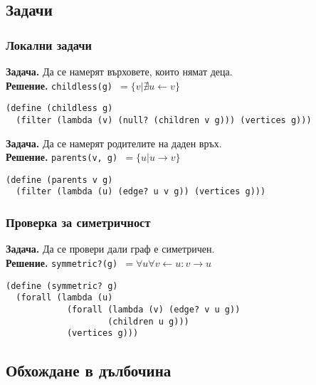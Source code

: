\documentclass{beamer}
\begin{document}
\subsection{Задачи}

\begin{frame}[fragile]
  \frametitle{Локални задачи}

  \small
  \textbf{Задача. }Да се намерят върховете, които нямат деца.\\
  \pause
  \textbf{Решение. }\tt{childless(g)} $ = \{v | \nexists u \leftarrow v \}$
  \pause
\begin{lstlisting}
(define (childless g)
  (filter (lambda (v) (null? (children v g))) (vertices g)))
\end{lstlisting}
  \pause
  \vspace{1em}
  \textbf{Задача. }Да се намерят родителите на даден връх.\\
  \pause
  \textbf{Решение. }\tt{parents(v, g)} $ = \{u | u \rightarrow v \}$
  \pause
\begin{lstlisting}
(define (parents v g)
  (filter (lambda (u) (edge? u v g)) (vertices g)))
\end{lstlisting}
\end{frame}

\begin{frame}[fragile]
  \frametitle{Проверка за симетричност}
  \textbf{Задача. }Да се провери дали граф е симетричен.\\
  \pause
  \textbf{Решение. }\tt{symmetric?(g)} $ = \forall u\forall v\leftarrow u: v\rightarrow u$
  \pause
\begin{lstlisting}
(define (symmetric? g)
  (forall (lambda (u)
            (forall (lambda (v) (edge? v u g))
                    (children u g)))
            (vertices g)))
\end{lstlisting}
\end{frame}

\subsection{Обхождане в дълбочина}
\end{document}
